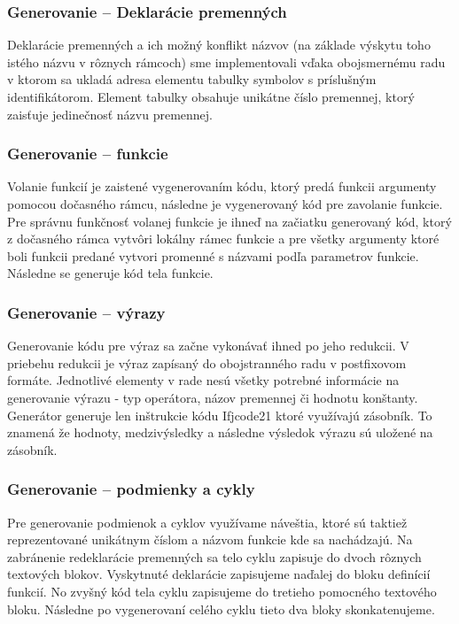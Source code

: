 \documentclass[a4paper, 11pt]{article}
\begin{document}
    \subsubsection{Generovanie -- Deklarácie premenných}
    Deklarácie premenných a ich možný konflikt názvov (na základe výskytu toho istého názvu v rôznych rámcoch)
    sme implementovali vďaka obojsmernému radu v ktorom sa ukladá adresa elementu tabulky
    symbolov s príslušným identifikátorom. Element tabulky obsahuje unikátne číslo premennej, ktorý zaisťuje jedinečnosť
    názvu premennej.

    \subsubsection{Generovanie -- funkcie}
    Volanie funkcií je zaistené vygenerovaním kódu, ktorý predá funkcii argumenty pomocou dočasného rámcu, následne
    je vygenerovaný kód pre zavolanie funkcie. Pre správnu funkčnosť volanej funkcie je ihneď na začiatku generovaný kód,
    ktorý z dočasného rámca vytvôri lokálny rámec funkcie a pre všetky argumenty ktoré boli funkcii predané vytvori
    promenné s názvami podľa parametrov funkcie. Následne se generuje kód tela funkcie.

    \subsubsection{Generovanie -- výrazy}
    Generovanie kódu pre výraz sa začne vykonávať ihned po jeho redukcii. V priebehu redukcii je výraz zapísaný do obojstranného radu
    v postfixovom formáte. Jednotlivé elementy v rade nesú všetky potrebné
    informácie na generovanie výrazu - typ operátora, názov premennej či hodnotu konštanty. Generátor generuje len inštrukcie
    kódu Ifjcode21 ktoré využívajú zásobník. To znamená že hodnoty, medzivýsledky a následne výsledok výrazu sú
    uložené na zásobník.

    \subsubsection{Generovanie -- podmienky a cykly}
    Pre generovanie podmienok a cyklov využívame náveštia, ktoré sú taktiež reprezentované unikátnym číslom a
    názvom funkcie kde sa nachádzajú. Na zabránenie redeklarácie premenných sa telo cyklu zapisuje do dvoch rôznych textových
    blokov. Vyskytnuté deklarácie zapisujeme naďalej do bloku definícií funkcií. No zvyšný kód tela cyklu zapisujeme do
    tretieho pomocného textového bloku. Následne po vygenerovaní celého cyklu tieto dva bloky skonkatenujeme.
\end{document}
